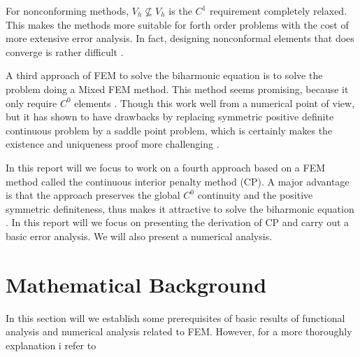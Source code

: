 For nonconforming methods, $V_{h} \not \subseteq  V_{h}$ is the $C^{1}$ requirement completely relaxed. This makes the methods more suitable for forth order problems with the cost of more extensive error analysis. In fact, designing nonconformal
elements that does converge is rather difficult \cite{shi02, nair21}.

A third approach of FEM to solve the biharmonic equation is to solve the problem doing a Mixed FEM method. This method seems promising, because it only require $C^{0}$ elements \cite{chen08, brezzi91}.
Though this work well from a numerical point of view, but it has shown to have drawbacks by replacing symmetric positive definite continuous problem
by a saddle point problem, which is certainly makes the existence and uniqueness proof more challenging \cite{brezzi74}.

In this report will we focus to work on a fourth approach based on a FEM method called the continuous interior penalty method (CP). A major advantage is that the approach preserves the global $C^{0}$ continuity and the positive symmetric definiteness, thus makes it attractive to solve the biharmonic equation \cite{brenner2012, brenner2012quadratic}. In this report will we focus on presenting the derivation of CP and carry out a basic error analysis. We will also present a numerical analysis.


\section{Mathematical Background}%
\label{sub:mathematical_background}

In this section will we establish some prerequisites of basic results of functional analysis and numerical analysis related to FEM. However, for a more thoroughly explanation i refer to \cite{brenner07math,manzoni2021optimal, quartdiff}













